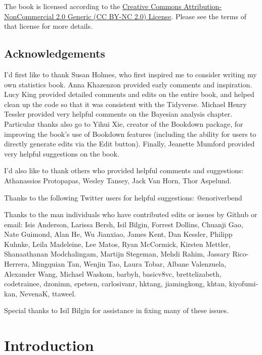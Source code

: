 \documentclass[12pt,]{book}
\theoremstyle{definition}
\theoremstyle{definition}
\theoremstyle{definition}
\theoremstyle{remark}
\begin{document}
The book is licensed according to the \href{https://creativecommons.org/licenses/by-nc/2.0/}{Creative Commons Attribution-NonCommercial 2.0 Generic (CC BY-NC 2.0) License}. Please see the terms of that license for more details.

\hypertarget{acknowledgements}{%
\section{Acknowledgements}\label{acknowledgements}}

I'd first like to thank Susan Holmes, who first inspired me to consider writing my own statistics book. Anna Khazenzon provided early comments and inspiration. Lucy King provided detailed comments and edits on the entire book, and helped clean up the code so that it was consistent with the Tidyverse. Michael Henry Tessler provided very helpful comments on the Bayesian analysis chapter. Particular thanks also go to Yihui Xie, creator of the Bookdown package, for improving the book's use of Bookdown features (including the ability for users to directly generate edits via the Edit button). Finally, Jeanette Mumford provided very helpful suggestions on the book.

I'd also like to thank others who provided helpful comments and suggestions: Athanassios Protopapas, Wesley Tansey, Jack Van Horn, Thor Aspelund.

Thanks to the following Twitter users for helpful suggestions: @enoriverbend

Thanks to the man individuals who have contributed edits or issues by Github or email:
Isis Anderson, Larissa Bersh, Isil Bilgin, Forrest Dollins, Chuanji Gao, Nate Guimond, Alan He, Wu Jianxiao, James Kent, Dan Kessler, Philipp Kuhnke, Leila Madeleine, Lee Matos, Ryan McCormick, Kirsten Mettler, Shanaathanan Modchalingam, Martijn Stegeman, Mehdi Rahim, Jassary Rico-Herrera, Mingquian Tan, Wenjin Tao, Laura Tobar, Albane Valenzuela, Alexander Wang, Michael Waskom,
barbyh, basicv8vc, brettelizabeth, codetrainee, dzonimn, epetsen, carlosivanr, hktang, jiamingkong, khtan, kiyofumi-kan, NevenaK, ttaweel.

Special thanks to Isil Bilgin for assistance in fixing many of these issues.

\hypertarget{introduction}{%
\chapter{Introduction}\label{introduction}}
\end{document}
